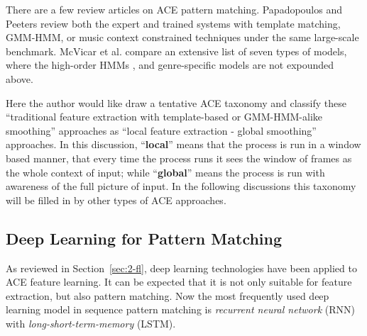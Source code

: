 There are a few review articles on ACE pattern matching. Papadopoulos and Peeters \cite{papadopoulos2007large} review both the expert and trained systems with template matching, GMM-HMM, or music context constrained techniques under the same large-scale benchmark. McVicar et al. \cite{mcvicar2014automatic} compare an extensive list of seven types of models, where the high-order HMMs \cite{scholz2009robust,mauch2007discovering,khadkevich2009use,yoshii2011vocabulary}, and genre-specific models \cite{lee2008acoustic,lee2007system} are not expounded above.

Here the author would like draw a tentative ACE taxonomy and classify these ``traditional feature extraction with template-based or GMM-HMM-alike smoothing'' approaches as ``local feature extraction - global smoothing'' approaches. In this discussion, ``\textbf{local}'' means that the process is run in a window based manner, that every time the process runs it sees the window of frames as the whole context of input; while ``\textbf{global}'' means the process is run with awareness of the full picture of input. In the following discussions this taxonomy will be filled in by other types of ACE approaches.

\subsection{Deep Learning for Pattern Matching} \label{sec:2-rnnpm}
As reviewed in Section~\ref{sec:2-fl}, deep learning technologies have been applied to ACE feature learning. It can be expected that it is not only suitable for feature extraction, but also pattern matching. Now the most frequently used deep learning model in sequence pattern matching is {\it recurrent neural network} (RNN) with {\it long-short-term-memory} (LSTM).

